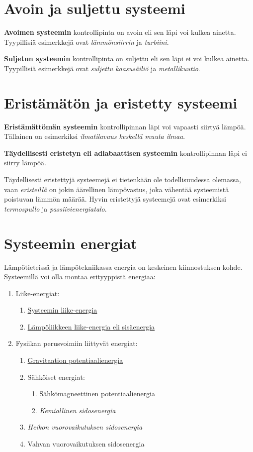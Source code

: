 \documentclass[12pt,a4paper,finnish]{book}
\begin{document}
\section{Avoin ja suljettu systeemi}

\textbf{Avoimen systeemin} kontrollipinta on avoin eli sen läpi voi kulkea ainetta. Tyypillisiä esimerkkejä 
ovat \textit{lämmönsiirrin} ja \textit{turbiini}.

\textbf{Suljetun systeemin} kontrollipinta on suljettu eli sen läpi ei voi kulkea ainetta. Tyypillisiä 
esimerkkejä ovat \textit{suljettu kaasusäiliö} ja \textit{metallikuutio}.

\section{Eristämätön ja eristetty systeemi}

\textbf{Eristämättömän systeemin} kontrollipinnan läpi voi vapaasti siirtyä lämpöä. 
Tällainen on esimerkiksi \textit{ilmatilavuus keskellä muuta ilmaa}.

\textbf{Täydellisesti eristetyn eli adiabaattisen systeemin} kontrollipinnan läpi ei siirry lämpöä.

Täydellisesti eristettyjä systeemejä ei tietenkään ole todellisuudessa olemassa, vaan \textit{eristeillä} 
on jokin äärellinen lämpövastus, joka vähentää systeemistä poistuvan lämmön määrää. Hyvin eristettyjä 
systeemejä ovat esimerkiksi \textit{termospullo} ja \textit{passiivienergiatalo}.

\section{Systeemin energiat}

Lämpötieteissä ja lämpötekniikassa energia on keskeinen kiinnostuksen kohde. Systeemillä voi 
olla montaa erityyppistä energiaa:

\begin{enumerate}
 \item Liike-energiat:
 \begin{enumerate}
  \item \underline{Systeemin liike-energia}
  \item \underline{Lämpöliikkeen liike-energia eli sisäenergia}
 \end{enumerate}
 \item Fysiikan perusvoimiin liittyvät energiat:
 \begin{enumerate}
  \item \underline{Gravitaation potentiaalienergia}
  \item Sähköiset energiat:
  \begin{enumerate}
   \item Sähkömagneettinen potentiaalienergia
   \item \textit{Kemiallinen sidosenergia}
  \end{enumerate}
  \item \textit{Heikon vuorovaikutuksen sidosenergia}
  \item Vahvan vuorovaikutuksen sidosenergia
 \end{enumerate}
\end{enumerate}
\end{document}
